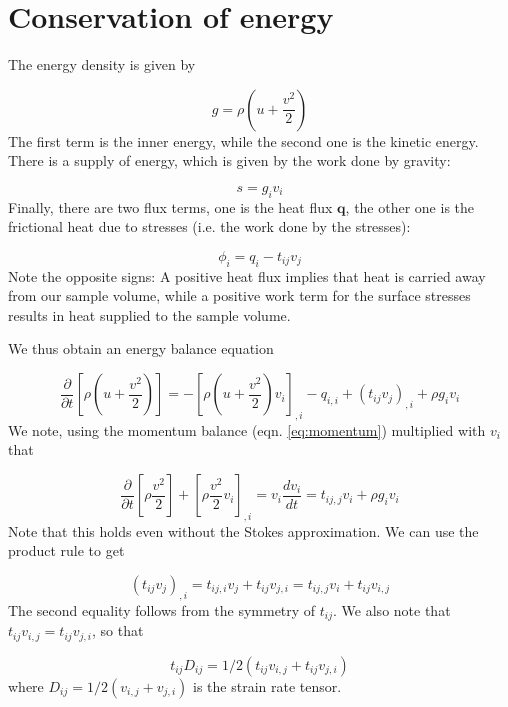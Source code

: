 \documentclass[12pt, openany]{memoir}
\newcommand{\pder}[2]{\ensuremath{\frac{\partial #1}{\partial #2}}}
\begin{document}
\section{Conservation of energy}

The energy density is given by

\begin{equation}
g = \rho (u + \frac{v^2}{2})
\end{equation}
The first term is the inner energy, while the second one is the
kinetic energy. There is a supply of energy, which is given by the
work done by gravity:

\begin{equation}
s=g_i v_i
\end{equation}
Finally, there are two flux terms, one is the heat flux $\mathbf{q}$,
the other one is the frictional heat due to stresses (i.e. the work
done by the stresses):

\begin{equation}
\phi_i = q_i - t_{ij} v_j
\end{equation}
Note the opposite signs: A positive heat flux implies that heat is
carried away from our sample volume, while a positive work term for
the surface stresses results in heat supplied to the sample volume. 

We thus obtain an energy balance equation

\begin{equation}
\pder{}{t} \left[ \rho \left( u + \frac{v^2}{2} \right) \right] = -
\left[ \rho \left( u + \frac{v^2}{2} \right) v_i \right]_{,i} -
q_{i,i} + (t_{ij}v_j)_{,i} + \rho g_i v_i
\end{equation}
We note, using the momentum balance (eqn. \ref{eq:momentum})
multiplied with $v_i$ that

\begin{equation}
\pder{}{t} \left[ \rho \frac{v^2}{2} \right] +
\left[ \rho \frac{v^2}{2} v_i \right]_{,i} = v_i \frac{d v_i}{dt} =
t_{ij,j}v_i + \rho g_i v_i 
\end{equation}
Note that this holds even without the Stokes approximation. We can use
the product rule to get

\begin{equation}
(t_{ij}v_j)_{,i} = t_{ij,i}v_j + t_{ij}v_{j,i} = t_{ij,j}v_i +
  t_{ij}v_{i,j}
\end{equation}
The second equality follows from the symmetry of $t_{ij}$. We also
note that $t_{ij}v_{i,j} = t_{ij}v_{j,i}$, so that

\begin{equation}
t_{ij}D_{ij} = 1/2(t_{ij}v_{i,j} + t_{ij}v_{j,i})
\end{equation}
where $D_{ij} = 1/2 (v_{i,j} + v_{j,i})$ is the strain rate tensor.
\end{document}
